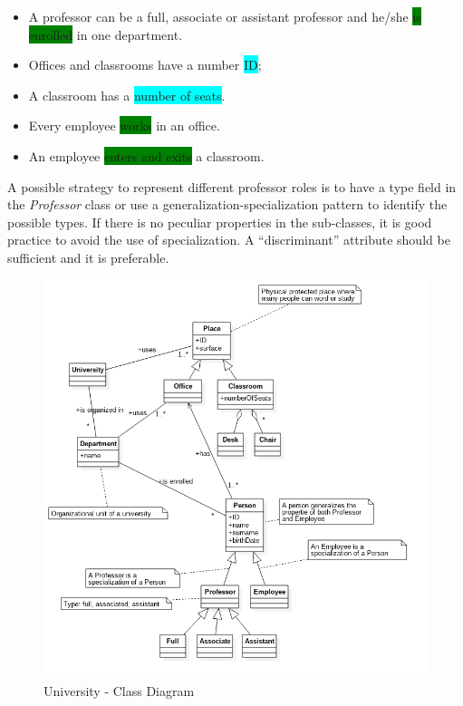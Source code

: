 \begin{itemize}
\item A professor can be a full, associate or assistant professor and he/she \colorbox{green}{is enrolled} in one department.
\item Offices and classrooms have a number \colorbox{cyan}{ID};
\item A classroom has a \colorbox{cyan}{number of seats}.
\item Every employee \colorbox{green}{works} in an office.
\item An employee \colorbox{green}{enters and exits} a classroom.
\end{itemize}

A possible strategy to represent different professor roles is to have a type field in the \emph{Professor} class or use a generalization-specialization pattern to identify the possible types. If there is no peculiar properties in the sub-classes, it is good practice to avoid the use of specialization. A ``discriminant'' attribute should be sufficient and it is preferable.

\begin{figure}[hbtp]
\centering
\includegraphics[scale=0.45]{exercises/classDiagram_university.png}
\caption{University - Class Diagram}
\end{figure}

